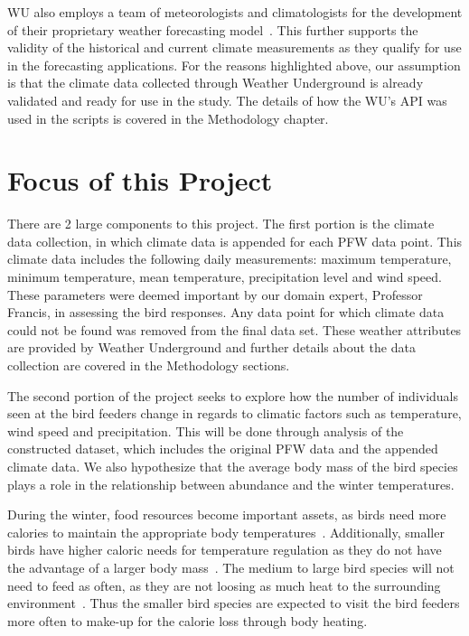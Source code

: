 WU also employs a team of meteorologists and climatologists for the development of their proprietary weather forecasting model~\cite{WUAbout:online}. This further supports the validity of the historical and current climate measurements as they qualify for use in the forecasting applications. For the reasons highlighted above, our assumption is that the climate data collected through Weather Underground is already validated and ready for use in the study. The details of how the WU's API was used in the scripts is covered in the Methodology chapter. 

     


\section{Focus of this Project}

There are 2 large components to this project. The first portion is the climate data collection, in which climate data is appended for each PFW data point. This climate data includes the following daily measurements: maximum temperature, minimum temperature, mean temperature, precipitation level and wind speed. These parameters were deemed important by our domain expert, Professor Francis, in assessing the bird responses. Any data point for which climate data could not be found was removed from the final data set. These weather attributes are provided by Weather Underground and further details about the data collection are covered in the Methodology sections.   

The second portion of the project seeks to explore how the number of individuals seen at the bird feeders change in regards to climatic factors such as temperature, wind speed and precipitation. This will be done through analysis of the constructed dataset, which includes the original PFW data and the appended climate data. We also hypothesize that the average body mass of the bird species plays a role in the relationship between abundance and the winter temperatures.  

During the winter, food resources become important assets, as birds need more calories to maintain the appropriate body temperatures~\cite{kendeigh1949effect}. Additionally, smaller birds have higher caloric needs for temperature regulation as they do not have the advantage of a larger body mass~\cite{kendeigh1970energy}. The medium to large bird species will not need to feed as often, as they are not loosing as much heat to the surrounding environment~\cite{kendeigh1970energy}. Thus the smaller bird species are expected to visit the bird feeders more often to make-up for the calorie loss through body heating.

